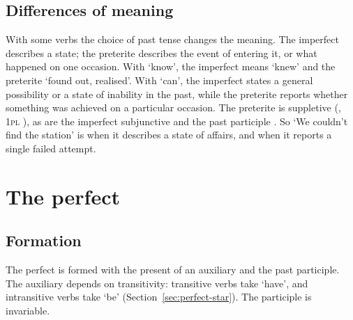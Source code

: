 \subsection{Differences of meaning}\label{sec:pret-impf-meaning}
With some verbs the choice of past tense changes the meaning. The imperfect describes a state; the preterite describes the event of entering it, or what happened on one occasion. With  `know', the imperfect means `knew' and the preterite `found out, realised'.
With  `can', the imperfect  states a general possibility or a state of inability in the past, while the preterite  reports whether something was achieved on a particular occasion. The preterite is suppletive (, 1\textsc{pl} ), as are the imperfect subjunctive  and the past participle . So `We couldn't find the station' is  when it describes a state of affairs, and  when it reports a single failed attempt.

\section{The perfect}\label{sec:perfect}

\subsection{Formation}
The perfect is formed with the present of an auxiliary and the past participle. The auxiliary depends on transitivity: transitive verbs take  `have', and intransitive verbs take  `be' (Section~\ref{sec:perfect-star}). The participle is invariable.


